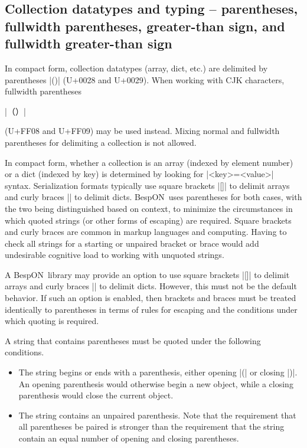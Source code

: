 \documentclass[11pt]{article}
\newcommand{\bespon}{BespON}
\begin{document}
\subsection{Collection datatypes and typing -- parentheses, fullwidth parentheses, greater-than sign, and fullwidth greater-than sign}

In compact form, collection datatypes (array, dict, etc.) are delimited by parentheses |()| (U+0028 and U+0029).  When working with CJK characters, fullwidth parentheses \begin{CJK*}{UTF8}{gkai}|（）|\end{CJK*} (U+FF08 and U+FF09) may be used instead.  Mixing normal and fullwidth parentheses for delimiting a collection is not allowed.

In compact form, whether a collection is an array (indexed by element number) or a dict (indexed by key) is determined by looking for |<key>=<value>| syntax.  Serialization formats typically use square brackets |[]| to delimit arrays and curly braces |{}| to delimit dicts.  \bespon\ uses parentheses for both cases, with the two being distinguished based on context, to minimize the circumstances in which quoted strings (or other forms of escaping) are required.  Square brackets and curly braces are common in markup languages and computing.  Having to check all strings for a starting or unpaired bracket or brace would add undesirable cognitive load to working with unquoted strings.

A \bespon\ library may provide an option to use square brackets |[]| to delimit arrays and curly braces |{}| to delimit dicts.  However, this must not be the default behavior.  If such an option is enabled, then brackets and braces must be treated identically to parentheses in terms of rules for escaping and the conditions under which quoting is required.

A string that contains parentheses must be quoted under the following conditions.
\begin{itemize}
\item The string begins or ends with a parenthesis, either opening |(| or closing |)|.  An opening parenthesis would otherwise begin a new object, while a closing parenthesis would close the current object.
\item The string contains an unpaired parenthesis.  Note that the requirement that all parentheses be paired is stronger than the requirement that the string contain an equal number of opening and closing parentheses.
\end{itemize}
\end{document}
